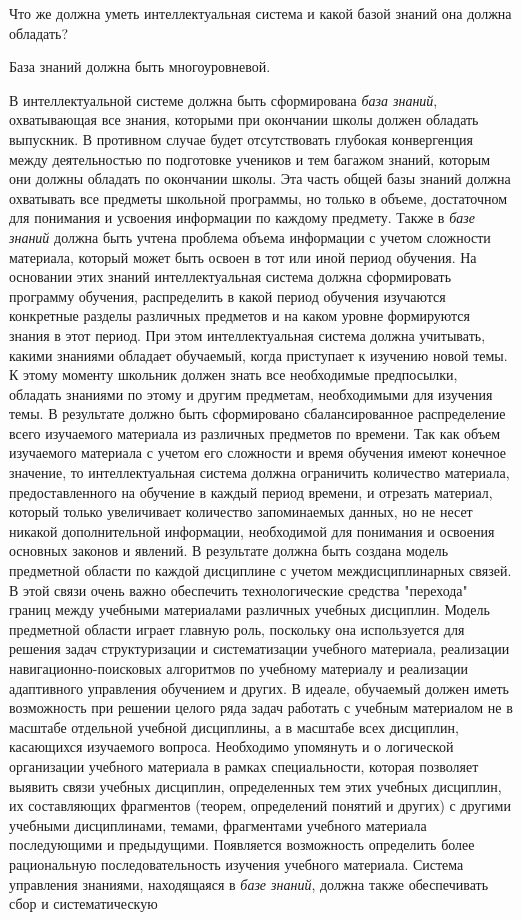 Что же должна уметь интеллектуальная система и какой базой знаний она должна обладать?

\begin{textitemize}
	\item База знаний должна быть многоуровневой.
	\item В интеллектуальной системе должна быть сформирована \textit{база знаний}, охватывающая все знания, которыми при окончании школы должен обладать выпускник. В противном случае будет отсутствовать глубокая конвергенция между деятельностью по подготовке учеников и тем багажом знаний, которым они должны обладать по окончании школы. Эта часть общей базы знаний должна охватывать все предметы школьной программы, но только в объеме, достаточном для понимания и усвоения информации по каждому предмету. Также в \textit{базе знаний} должна быть учтена проблема объема информации с учетом сложности материала, который может быть освоен в тот или иной период обучения. На основании этих знаний интеллектуальная система должна сформировать программу обучения, распределить в какой период обучения изучаются конкретные разделы различных предметов и на каком уровне формируются знания в этот период. При этом интеллектуальная система должна учитывать, какими знаниями обладает обучаемый, когда приступает к изучению новой темы. К этому моменту школьник должен знать все необходимые предпосылки, обладать знаниями по этому и другим предметам, необходимыми для изучения темы. В результате должно быть сформировано сбалансированное распределение всего изучаемого материала из различных предметов по времени. Так как объем изучаемого материала с учетом его сложности и время обучения имеют конечное значение, то интеллектуальная система должна ограничить количество материала, предоставленного на обучение в каждый период времени, и отрезать материал, который только увеличивает количество запоминаемых данных, но не несет никакой дополнительной информации, необходимой для понимания и освоения основных законов и явлений. В результате должна быть создана модель предметной области по каждой дисциплине с учетом междисциплинарных связей. В этой связи очень важно обеспечить технологические средства "перехода"{} границ между учебными материалами различных учебных дисциплин. Модель предметной области играет главную роль, поскольку она используется для решения задач структуризации и систематизации учебного материала, реализации навигационно-поисковых алгоритмов по учебному материалу и реализации адаптивного управления обучением и других. В идеале, обучаемый должен иметь возможность при решении целого ряда задач работать с учебным материалом не в масштабе отдельной учебной дисциплины, а в масштабе всех дисциплин, касающихся изучаемого вопроса. Необходимо упомянуть и о логической организации учебного материала в рамках специальности, которая позволяет выявить связи учебных дисциплин, определенных тем этих учебных дисциплин, их составляющих фрагментов (теорем, определений понятий и других) с другими учебными дисциплинами, темами, фрагментами учебного материала последующими и предыдущими. Появляется возможность определить более рациональную последовательность изучения учебного материала. Система управления знаниями, находящаяся в \textit{базе знаний}, должна также обеспечивать сбор и систематическую 
\end{textitemize}
